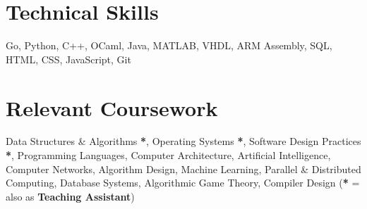 \documentclass[letterpaper,10pt]{resume}
\newcommand{\resumeItem }[2]{
  \item\small{
    \textbf{#1}{: #2 \vspace{-4.5pt}}
  }
}
\newcommand{\resumeSubItem}[2]{\resumeItem{#1}{#2}\vspace{0pt}}
\newcommand{\resumeSubHeadingListEnd}{\end{itemize}}
\begin{document}
  

\vspace{-0.1cm}
\section{Technical Skills}
 {Go, Python, C++, OCaml, Java, MATLAB, VHDL, ARM Assembly, SQL, HTML, CSS, JavaScript, Git} %
 \vspace{-0.1cm}

\section{Relevant Coursework}
    {Data Structures \& Algorithms \textbf{*}, Operating Systems \textbf{*}, Software Design Practices \textbf{*}, Programming Languages, Computer Architecture, Artificial Intelligence, Computer Networks, Algorithm Design, Machine Learning, Parallel \& Distributed Computing, Database Systems, Algorithmic Game Theory, Compiler Design \hfill(\textbf{*} = also as \textbf{Teaching Assistant})}

    
 
\end{document}
